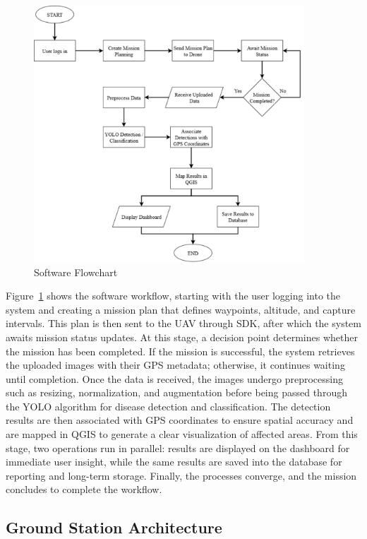 \begin{figure}[H]
	\centering
	\caption{Software Flowchart}
	\label{fig:SoftFlow}
	\includegraphics[width=0.9\textwidth]{figures/Soft_Flow.pdf}
\end{figure}

Figure~\ref{fig:SoftFlow} shows the software workflow, starting with the user logging into the system and creating a mission plan that defines waypoints, altitude, and capture intervals. This plan is then sent to the UAV through SDK, after which the system awaits mission status updates. At this stage, a decision point determines whether the mission has been completed. If the mission is successful, the system retrieves the uploaded images with their GPS metadata; otherwise, it continues waiting until completion. Once the data is received, the images undergo preprocessing such as resizing, normalization, and augmentation before being passed through the YOLO algorithm for disease detection and classification. The detection results are then associated with GPS coordinates to ensure spatial accuracy and are mapped in QGIS to generate a clear visualization of affected areas. From this stage, two operations run in parallel: results are displayed on the dashboard for immediate user insight, while the same results are saved into the database for reporting and long-term storage. Finally, the processes converge, and the mission concludes to complete the workflow.

\subsection*{Ground Station Architecture}

